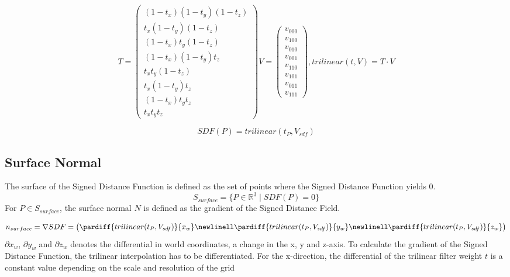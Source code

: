 \begin{equation}
T =
\begin{pmatrix}
(1 - t_x) (1 - t_y) (1 - t_z) \\
t_x (1 - t_y) (1 - t_z) \\
(1 - t_x) t_y (1 - t_z) \\
(1 - t_x) (1 - t_y) t_z \\
t_x t_y (1 - t_z) \\
t_x (1 - t_y) t_z \\
(1 - t_x) t_y t_z \\
t_x t_y t_z
\end{pmatrix}	
V =
\begin{pmatrix}
v_{000} \\
v_{100} \\
v_{010} \\
v_{001} \\
v_{110} \\
v_{101} \\
v_{011} \\
v_{111} 
\end{pmatrix}
, trilinear(t, V) = T \cdot V
\end{equation}

\begin{equation}
SDF(P) = trilinear(t_P, V_{sdf})
\end{equation}

\subsection{Surface Normal}

The surface of the Signed Distance Function is defined as the set of points where the Signed Distance Function yields 0.
\begin{equation}
S_{surface} = \{P \in \mathbb{R}^3 \mid SDF(P) = 0\}
\end{equation}
For $P \in S_{surface}$, the surface normal $N$ is defined as the gradient of the Signed Distance Field.

\begin{equation}
n_{surface} = \nabla SDF = 
\begin{pmatrix}
\pardiff{trilinear(t_P, V_{sdf})}{x_{w}} \newlinell
\pardiff{trilinear(t_P, V_{sdf})}{y_{w}} \newlinell
\pardiff{trilinear(t_P, V_{sdf})}{z_{w}}
\end{pmatrix}
\end{equation}
$\partial x_{w}$, $\partial y_{w}$ and $\partial z_{w}$ denotes the differential in world coordinates, a change in the x, y and z-axis. To calculate the gradient of the Signed Distance Function, the trilinear interpolation has to be differentiated. For the x-direction, the differential of the trilinear filter weight $t$ is a constant value depending on the scale and resolution of the grid

